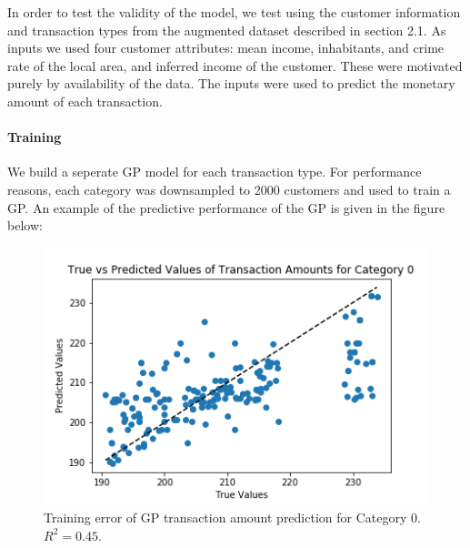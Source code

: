 \documentclass[]{article}
\begin{document}
In order to test the validity of the model, we test using the customer
information and transaction types from the augmented dataset described
in section 2.1. As inputs we used four customer attributes: mean income,
inhabitants, and crime rate of the local area, and inferred income of
the customer. These were motivated purely by availability of the data.
The inputs were used to predict the monetary amount of each transaction.

\paragraph{Training}\label{training}

We build a seperate GP model for each transaction type. For performance
reasons, each category was downsampled to 2000 customers and used to
train a GP. An example of the predictive performance of the GP is given
in the figure below:

\begin{figure}
\centering
\includegraphics{uploads/upload_293f576878604f4f3bcc81bbe9e07422.png}
\caption{Training error of GP transaction amount prediction for Category 0. $R^2 = 0.45$.}
\label{fig:gp_predict_error}
\end{figure}


\end{document}
